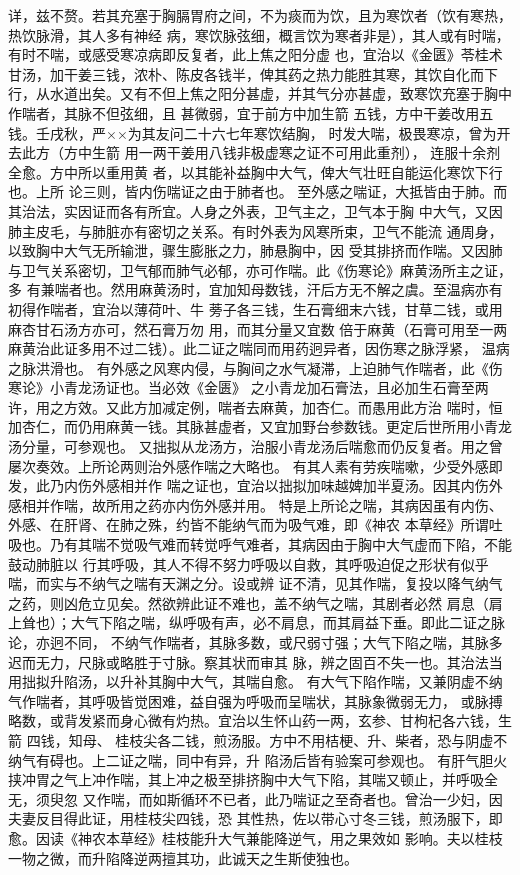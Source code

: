 \documentclass[a4paper,12pt,UTF8,twoside]{ctexbook}
\begin{document}
详，兹不赘。若其充塞于胸膈胃府之间，不为痰而为饮，且为寒饮者（饮有寒热，热饮脉滑，其人多有神经 
病，寒饮脉弦细，概言饮为寒者非是），其人或有时喘，有时不喘，或感受寒凉病即反复者，此上焦之阳分虚 
也，宜治以《金匮》苓桂术甘汤，加干姜三钱，浓朴、陈皮各钱半，俾其药之热力能胜其寒，其饮自化而下 
行，从水道出矣。又有不但上焦之阳分甚虚，并其气分亦甚虚，致寒饮充塞于胸中作喘者，其脉不但弦细，且 
甚微弱，宜于前方中加生箭 五钱，方中干姜改用五钱。壬戌秋，严××为其友问二十六七年寒饮结胸， 
时发大喘，极畏寒凉，曾为开去此方（方中生箭 用一两干姜用八钱非极虚寒之证不可用此重剂）， 
连服十余剂全愈。方中所以重用黄 者，以其能补益胸中大气，俾大气壮旺自能运化寒饮下行也。上所 
论三则，皆内伤喘证之由于肺者也。 
至外感之喘证，大抵皆由于肺。而其治法，实因证而各有所宜。人身之外表，卫气主之，卫气本于胸 
中大气，又因肺主皮毛，与肺脏亦有密切之关系。有时外表为风寒所束，卫气不能流 
通周身，以致胸中大气无所输泄，骤生膨胀之力，肺悬胸中，因 
受其排挤而作喘。又因肺与卫气关系密切，卫气郁而肺气必郁，亦可作喘。此《伤寒论》麻黄汤所主之证，多 
有兼喘者也。然用麻黄汤时，宜加知母数钱，汗后方无不解之虞。至温病亦有初得作喘者，宜治以薄荷叶、牛 
蒡子各三钱，生石膏细末六钱，甘草二钱，或用麻杏甘石汤方亦可，然石膏万勿 用，而其分量又宜数 
倍于麻黄（石膏可用至一两麻黄治此证多用不过二钱）。此二证之喘同而用药迥异者，因伤寒之脉浮紧， 
温病之脉洪滑也。 
有外感之风寒内侵，与胸间之水气凝滞，上迫肺气作喘者，此《伤寒论》小青龙汤证也。当必效《金匮》 
之小青龙加石膏法，且必加生石膏至两许，用之方效。又此方加减定例，喘者去麻黄，加杏仁。而愚用此方治 
喘时，恒加杏仁，而仍用麻黄一钱。其脉甚虚者，又宜加野台参数钱。更定后世所用小青龙汤分量，可参观也。 
又拙拟从龙汤方，治服小青龙汤后喘愈而仍反复者。用之曾屡次奏效。上所论两则治外感作喘之大略也。 
有其人素有劳疾喘嗽，少受外感即发，此乃内伤外感相并作 
喘之证也，宜治以拙拟加味越婢加半夏汤。因其内伤外感相并作喘，故所用之药亦内伤外感并用。 
特是上所论之喘，其病因虽有内伤、外感、在肝肾、在肺之殊，约皆不能纳气而为吸气难，即《神农 
本草经》所谓吐吸也。乃有其喘不觉吸气难而转觉呼气难者，其病因由于胸中大气虚而下陷，不能鼓动肺脏以 
行其呼吸，其人不得不努力呼吸以自救，其呼吸迫促之形状有似乎喘，而实与不纳气之喘有天渊之分。设或辨 
证不清，见其作喘，复投以降气纳气之药，则凶危立见矣。然欲辨此证不难也，盖不纳气之喘，其剧者必然 
肩息（肩上耸也）；大气下陷之喘，纵呼吸有声，必不肩息，而其肩益下垂。即此二证之脉论，亦迥不同， 
不纳气作喘者，其脉多数，或尺弱寸强；大气下陷之喘，其脉多迟而无力，尺脉或略胜于寸脉。察其状而审其 
脉，辨之固百不失一也。其治法当用拙拟升陷汤，以升补其胸中大气，其喘自愈。 
有大气下陷作喘，又兼阴虚不纳气作喘者，其呼吸皆觉困难，益自强为呼吸而呈喘状，其脉象微弱无力， 
或脉搏略数，或背发紧而身心微有灼热。宜治以生怀山药一两，玄参、甘枸杞各六钱，生箭 四钱，知母、 
桂枝尖各二钱，煎汤服。方中不用桔梗、升、柴者，恐与阴虚不纳气有碍也。上二证之喘，同中有异，升 
陷汤后皆有验案可参观也。 
有肝气胆火挟冲胃之气上冲作喘，其上冲之极至排挤胸中大气下陷，其喘又顿止，并呼吸全无，须臾忽 
又作喘，而如斯循环不已者，此乃喘证之至奇者也。曾治一少妇，因夫妻反目得此证，用桂枝尖四钱，恐 
其性热，佐以带心寸冬三钱，煎汤服下，即愈。因读《神农本草经》桂枝能升大气兼能降逆气，用之果效如 
影响。夫以桂枝一物之微，而升陷降逆两擅其功，此诚天之生斯使独也。 
\end{document}
